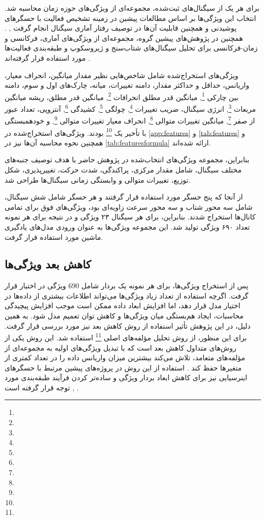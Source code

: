 برای هر یک از سیگنال‌های ثبت‌شده، مجموعه‌ای از ویژگی‌های حوزه زمان محاسبه شد. انتخاب این ویژگی‌ها بر اساس مطالعات پیشین در زمینه تشخیص فعالیت با حسگرهای پوشیدنی و همچنین قابلیت آن‌ها در توصیف رفتار آماری سیگنال انجام گرفت
\cite{Bao2004ActivityRecognition},
\cite{Ravi2005ActivityRecognition}.
همچنین در پژوهش‌های پیشین گروه، مجموعه‌ای از ویژگی‌های آماری، فرکانسی و زمان-فرکانسی برای تحلیل سیگنال‌های شتاب‌سنج و ژیروسکوپ و طبقه‌بندی فعالیت‌ها مورد استفاده قرار گرفته‌اند
\cite{Ejtehadi2022Thesis}.

ویژگی‌های استخراج‌شده شامل شاخص‌هایی نظیر مقدار میانگین، انحراف معیار، واریانس، حداقل و حداکثر مقدار، دامنه تغییرات، میانه، چارک‌های اول و سوم، دامنه بین چارکی
\footnote{},
میانگین قدر مطلق انحرافات
\footnote{},
میانگین قدر مطلق، ریشه میانگین مربعات
\footnote{},
انرژی سیگنال، ضریب تغییرات
\footnote{},
چولگی
\footnote{},
کشیدگی
\footnote{},
آنتروپی، تعداد عبور از صفر
\footnote{},
میانگین تغییرات متوالی
\footnote{},
انحراف معیار تغییرات متوالی
\footnote{},
و خودهمبستگی با تأخیر یک
\footnote{}
بودند. ویژگی‌های استخراج‌شده در
\autoref{app:features}
و 
\autoref{tab:features}
و همچنین نحوه محاسبه آن‌ها نیز در 
\autoref{tab:featuresformula}
ارائه شده‌اند.

بنابراین، مجموعه ویژگی‌های انتخاب‌شده در پژوهش حاضر با هدف توصیف جنبه‌های مختلف سیگنال، شامل مقدار مرکزی، پراکندگی، شدت حرکت، تغییرپذیری، شکل توزیع، تغییرات متوالی و وابستگی زمانی سیگنال‌ها طراحی شد.

از آنجا که پنج حسگر مورد استفاده قرار گرفتند و هر حسگر شامل شش سیگنال، شامل سه محور شتاب و سه محور سرعت زاویه‌ای بود، ویژگی‌های فوق برای تمامی کانال‌ها استخراج شدند. بنابراین، برای هر سیگنال ۲۳ ویژگی و در نتیجه برای هر نمونه تعداد ۶۹۰ ویژگی تولید شد. این مجموعه ویژگی‌ها به عنوان ورودی مدل‌های یادگیری ماشین مورد استفاده قرار گرفت.

\subsection{کاهش بعد ویژگی‌ها}
\label{sec:demansionreduction}

پس از استخراج ویژگی‌ها، برای هر نمونه یک بردار شامل 690 ویژگی در اختیار قرار گرفت. اگرچه استفاده از تعداد زیاد ویژگی‌ها می‌تواند اطلاعات بیشتری از داده‌ها در اختیار مدل قرار دهد، اما افزایش ابعاد داده ممکن است موجب افزایش پیچیدگی محاسبات، ایجاد هم‌بستگی میان ویژگی‌ها و کاهش توان تعمیم مدل شود. به همین دلیل، در این پژوهش تأثیر استفاده از روش کاهش بعد نیز مورد بررسی قرار گرفت. برای این منظور، از روش تحلیل مؤلفه‌های اصلی 
\footnote{}
استفاده شد. این روش یکی از روش‌های متداول کاهش بعد است که با تبدیل ویژگی‌های اولیه به مجموعه‌ای از مؤلفه‌های متعامد، تلاش می‌کند بیشترین میزان واریانس داده را در تعداد کمتری از متغیرها حفظ کند 
\cite{Jolliffe2016PCAReview}.
 استفاده از این روش در پروژه‌های پیشین مرتبط با حسگرهای اینرسیایی نیز برای کاهش ابعاد بردار ویژگی و ساده‌تر کردن فرآیند طبقه‌بندی مورد توجه قرار گرفته است 
 \cite{Nasrabadi2019Thesis},
 \cite{Ejtehadi2022Thesis}.

